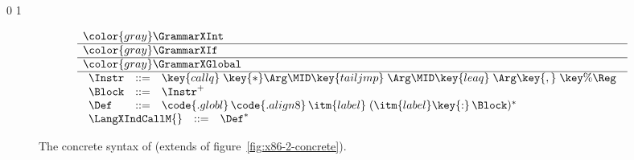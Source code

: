 \documentclass[7x10]{TimesAPriori_MIT}%
\newcommand{\gray}[1]{{\color{gray} #1}}
\def\xeightysixEd{0}
\def\riscvEd{1}
\def\architecture{1}
\numberwithin{theorem}{chapter}
\numberwithin{definition}{chapter}
\numberwithin{equation}{chapter}
\begin{document}
\if\architecture\xeightysixEd
\newcommand{\GrammarXIndCall}{
\begin{array}{lcl}
\Instr &::=&  \key{callq}\;\key{*}\Arg \MID \key{tailjmp}\;\Arg 
     \MID \key{leaq}\;\Arg\key{,}\;\key{\%}\Reg \\
\Block &::= & \Instr^{+} \\
\Def &::= & \code{.globl}\,\code{.align 8}\,\itm{label}\; (\itm{label}\key{:}\, \Block)^{*} 
\end{array}
}
\fi
\if\architecture\riscvEd
\newcommand{\GrammarXIndCall}{
\begin{array}{lcl}
\Instr &::=&  \key{jalr}\;\Arg \MID \key{tailjmp}\;\Arg 
     \MID \key{la}\;\key{\%}\Reg\key{,}\; \Arg \\
\Block &::= & \Instr^{+} \\
\Def &::= & \code{.globl}\,\code{.align 8}\,\itm{label}\; (\itm{label}\key{:}\, \Block)^{*} 
\end{array}
}\fi

\newcommand{\ASTXIndCallRacket}{
\begin{array}{lcl}
  \Instr &::=& \INDCALLQ{\Arg}{\itm{int}}
    \MID \TAILJMP{\Arg}{\itm{int}}\\
    &\MID& \BININSTR{\code{'leaq}}{\Arg}{\REG{\Reg}}\\
  \Block &::= & \BLOCK{\itm{info}}{\LP\Instr\ldots\RP}\\
  \Def &::= & \DEF{\itm{label}}{\code{'()}}{\Type}{\itm{info}}{\LP\LP\itm{label}\,\key{.}\,\Block\RP\ldots\RP} 
\end{array}
}

\begin{figure}[tp]
  \begin{tcolorbox}[colback=white]
\small
\[
\begin{array}{l}
  \gray{\GrammarXInt} \\ \hline
  \gray{\GrammarXIf} \\ \hline
  \gray{\GrammarXGlobal} \\ \hline
  \GrammarXIndCall \\
\begin{array}{lcl}
\LangXIndCallM{} &::= & \Def^{*}
\end{array}
\end{array}
\]
  \end{tcolorbox}

\caption{The concrete syntax of \LangXIndCall{} (extends \LangXGlobal{} of figure~\ref{fig:x86-2-concrete}).}
\label{fig:x86-3-concrete}
\end{figure}
\end{document}
